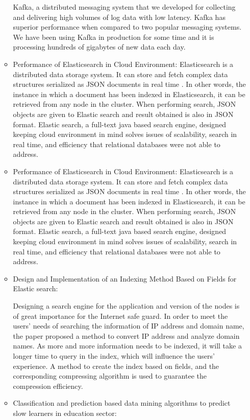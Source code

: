 \documentclass[oneside,a4paper,12pt]{book}
\begin{document}
\begin{enumerate}
\begin{itemize}
Kafka, a distributed messaging system that we developed for collecting and delivering high volumes of log data with low latency. Kafka has superior performance when compared to two popular messaging systems. We have been using Kafka in production for some time and it is processing hundreds of gigabytes of new data each day.
\item Performance of Elasticsearch in Cloud  Environment:
Elasticsearch is a distributed data storage system. It can store and fetch complex data structures serialized as JSON documents in real time . In other words, the instance in which a document has been indexed in Elasticsearch, it can be retrieved from any node in the cluster. When performing search, JSON objects are given to Elastic search and result obtained is also in JSON format. Elastic search, a full-text java based search engine, designed keeping cloud environment in mind solves issues of scalability, search in real time, and efficiency that relational databases were not able to address.
\item Performance of Elasticsearch in Cloud  Environment:
Elasticsearch is a distributed data storage system. It can store and fetch complex data structures serialized as JSON documents in real time . In other words, the instance in which a document has been indexed in Elasticsearch, it can be retrieved from any node in the cluster. When performing search, JSON objects are given to Elastic search and result obtained is also in JSON format. Elastic search, a full-text java based search engine, designed keeping cloud environment in mind solves issues of scalability, search in real time, and efficiency that relational databases were not able to address.
\item Design and Implementation of an Indexing Method Based on Fields for  Elastic search: 
 
Designing a search engine for the application and version of the nodes is of great importance for the Internet safe guard. In order to meet the users’ needs of searching the information of IP address and domain name, the paper proposed a method to convert IP address and analyze domain names. As more and more information needs to be indexed, it will take a longer time to query in the index, which will influence the users’ experience. A method to create the index based on fields, and the corresponding compressing algorithm is used to guarantee the compression efficiency. 
\item Classification and prediction based data mining algorithms to predict slow learners in education sector: 
 

\end{itemize}
\end{enumerate}
\end{document}
